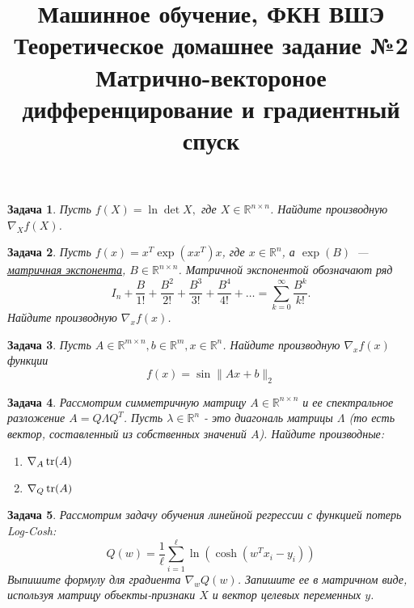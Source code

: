 \documentclass[12pt,fleqn]{article}
\title{Машинное обучение, ФКН ВШЭ\\Теоретическое домашнее задание №2\\Матрично-вектороное дифференцирование и градиентный спуск}
\author{}
\date{}
\newtheorem{esProblem}{Задача}
\begin{document}
\maketitle

\begin{esProblem}
    Пусть $f(X) = \ln \det X,$ где $X \in \mathbb{R}^{n\times n}$. Найдите производную $\nabla_X f(X)$.
\end{esProblem}

\begin{esProblem}
    Пусть $f(x) = x^T \exp(xx^T)x$, где $x \in \mathbb{R}^{n}$, а $\exp(B)$~--- \href{https://en.wikipedia.org/wiki/Matrix_exponential}{матричная экспонента},
    $B \in \mathbb{R}^{n \times n}$.
    Матричной экспонентой обозначают ряд
    \begin{equation*}
        I_n + \frac{B}{1!} + \frac{B^2}{2!} + \frac{B^3}{3!} + \frac{B^4}{4!} + \ldots = \sum_{k=0}^\infty \frac{B^k}{k!} .
    \end{equation*}
    Найдите производную $\nabla_x f(x)$.
\end{esProblem}

\begin{esProblem}
    Пусть $A \in \mathbb{R}^{m \times n}, b \in \mathbb{R}^m, x \in \mathbb{R}^n$. Найдите производную $\nabla_x f(x)$ функции
    \[
    f(x) = \sin \|Ax + b\|_2
    \]
\end{esProblem}

\begin{esProblem}
    Рассмотрим симметричную матрицу $A \in \mathbb{R}^{n \times n}$ и ее спектральное разложение $A = Q \Lambda Q^T$.
    Пусть $\lambda \in \mathbb{R}^n$ - это диагональ матрицы $\Lambda$ (то есть вектор, составленный из собственных значений $A$).
    Найдите производные:
    
    \begin{enumerate}
        \item $\displaystyle \nabla_A \mathop{\mathrm{tr}}(A)$
        \item $\displaystyle \nabla_Q \mathop{\mathrm{tr}}(A)$
    \end{enumerate}
\end{esProblem}

\begin{esProblem}
    Рассмотрим задачу обучения линейной регрессии с функцией потерь Log-Cosh:
    \[
    Q(w) = \frac{1}{\ell} \sum_{i=1}^{\ell} \ln (\cosh (w^T x_i - y_i))
    \]
    Выпишите формулу для градиента $\nabla_w Q(w)$. Запишите ее в матричном виде, используя матрицу объекты-признаки $X$ и вектор целевых переменных $y$.
\end{esProblem}
\end{document}
